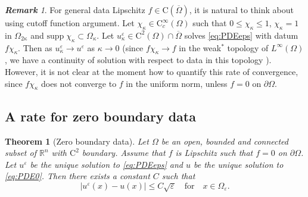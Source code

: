 \documentclass[11pt,reqno]{amsart}
\numberwithin{figure}{section}
\theoremstyle{plain}
\newtheorem{thm}{Theorem}[section]
\theoremstyle{remark}
\newtheorem{rem}{\bf{Remark}}
\numberwithin{equation}{section}
\newcommand{\R}{\mathbb{R}}
\newcommand{\rmC}{\mathrm{C}}
\begin{document}
\begin{rem} For general data Lipschitz $f\in \mathrm{C}(\overline{\Omega})$, it is natural to think about using cutoff function argument. Let $\chi_{{\kappa}}\in \mathrm{C}_c^\infty(\Omega)$ such that $0\leq \chi_{\kappa}\leq 1$, $\chi_\kappa = 1$ in $\Omega_{2\kappa}$ and $\mathrm{supp}\;\chi_\kappa\subset\Omega_\kappa$. Let $u^\varepsilon_\kappa\in \rmC^2(\Omega)\cap\overline{\Omega}$ solves \eqref{eq:PDEeps} with datum $f\chi_{\kappa}$. Then as $u^\varepsilon_\kappa\to u^\varepsilon$ as $\kappa\to 0$ (since $f\chi_\kappa\to f$ in the weak$^*$ topology of $L^\infty(\Omega)$, we have a continuity of solution with respect to data in this topology \cite[Remark II.1]{Lasry1989}). However, it is not clear at the moment how to quantify this rate of convergence, since $f\chi_\kappa$ does not converge to $f$ in the uniform norm, unless $f = 0$ on $\partial\Omega$. 
\end{rem}
 


\subsection{A rate for zero boundary data}


\begin{thm}[Zero boundary data]\label{thm:rate_doubling2} Let $\Omega$ be an open, bounded and connected subset of $\R^n$ with $\mathrm{C}^2$ boundary. Assume that $f$ is Lipschitz such that $f = 0$ on $\partial\Omega$. Let $u^\varepsilon$ be the unique solution to \eqref{eq:PDEeps} and $u$ be the unique solution to \eqref{eq:PDE0}. Then there exists a constant $C$ such that
\begin{equation*}
|u^\varepsilon(x) - u(x)| \leq C\sqrt{\varepsilon} \quad  \text{for} \quad x\in \Omega_{\varepsilon}.
\end{equation*}
\end{thm}
\end{document}
